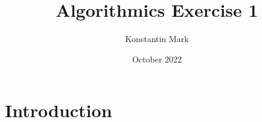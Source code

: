 \documentclass{article}
\title{Algorithmics Exercise 1}
\author{Konstantin Mark}
\date{October 2022}
\begin{document}
\maketitle

\section{Introduction}
\end{document}
